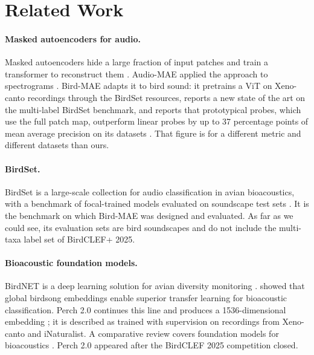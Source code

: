 \documentclass[letterpaper]{article} %
\begin{document}
\section{Related Work}
\paragraph{Masked autoencoders for audio.}
Masked autoencoders hide a large fraction of input patches and train a transformer to reconstruct them \citep{he2021masked}. Audio-MAE applied the approach to spectrograms \citep{huang2022masked}. Bird-MAE adapts it to bird sound: it pretrains a ViT on Xeno-canto recordings through the BirdSet resources, reports a new state of the art on the multi-label BirdSet benchmark, and reports that prototypical probes, which use the full patch map, outperform linear probes by up to 37 percentage points of mean average precision on its datasets \citep{rauch2025can}. That figure is for a different metric and different datasets than ours.

\paragraph{BirdSet.}
BirdSet is a large-scale collection for audio classification in avian bioacoustics, with a benchmark of focal-trained models evaluated on soundscape test sets \citep{rauch2025birdset}. It is the benchmark on which Bird-MAE was designed and evaluated. As far as we could see, its evaluation sets are bird soundscapes and do not include the multi-taxa label set of BirdCLEF+ 2025.

\paragraph{Bioacoustic foundation models.}
BirdNET is a deep learning solution for avian diversity monitoring \citep{kahl2021birdnet}. \citet{ghani2023global} showed that global birdsong embeddings enable superior transfer learning for bioacoustic classification. Perch 2.0 continues this line and produces a 1536-dimensional embedding \citep{vanmerrienboer2025perch}; it is described as trained with supervision on recordings from Xeno-canto and iNaturalist. A comparative review covers foundation models for bioacoustics \citep{schwinger2025foundation}. Perch 2.0 appeared after the BirdCLEF 2025 competition closed.
\end{document}
